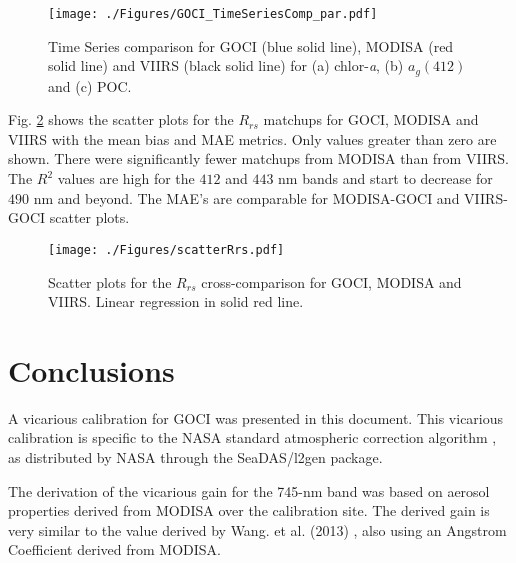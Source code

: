 \documentclass[10pt]{article}
\begin{document}
\begin{figure}[H]
  \centering
  \texttt{[image: ./Figures/GOCI\_TimeSeriesComp\_par.pdf]}
    \caption{Time Series comparison for GOCI (blue solid line), MODISA (red solid line) and VIIRS (black solid line) for (a) chlor-{\it a}, (b) $a_g(412)$ and (c) POC. \label{fig:GOCI_TimeSeriesComp_par}} 
\end{figure}
Fig. \ref{fig:scatterRrs} shows the scatter plots for the $R_{rs}$ matchups for GOCI, MODISA and VIIRS with the mean bias and MAE metrics. Only values greater than zero are shown. There were significantly fewer matchups from MODISA than from VIIRS. The $R^2$ values are high for the $412$ and $443$ nm bands and start to decrease for $490$ nm and beyond. The MAE's are comparable for MODISA-GOCI and VIIRS-GOCI scatter plots.
\begin{figure}[H]
  \centering
  \texttt{[image: ./Figures/scatterRrs.pdf]}
    \caption{Scatter plots for the $R_{rs}$ cross-comparison for GOCI, MODISA and VIIRS. Linear regression in solid red line. \label{fig:scatterRrs}} 
\end{figure}

\section{Conclusions}



A vicarious calibration for GOCI was presented in this document. This vicarious calibration is specific to the NASA standard atmospheric correction algorithm \cite{Mobley2016}, as distributed by NASA through the SeaDAS/l2gen package. 

The derivation of the vicarious gain for the 745-nm band was based on aerosol properties derived from MODISA over the calibration site. The derived gain is very similar to the value derived by Wang. et al. (2013) \cite{Wang:13}, also using an Angstrom Coefficient derived from MODISA. 
\end{document}

